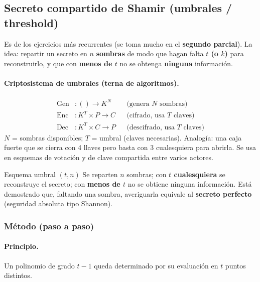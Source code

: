 \documentclass[../main.tex]{subfiles}
\begin{document}
\subsection{Secreto compartido de Shamir (umbrales / threshold)}


Es de los ejercicios más recurrentes (se toma mucho en el \textbf{segundo parcial}).
La idea: repartir un secreto en $n$ \textbf{sombras} de modo que hagan falta
\textbf{$t$ (o $k$)} para reconstruirlo, y que con \textbf{menos de $t$} no se obtenga
\textbf{ninguna} información.

\paragraph{Criptosistema de umbrales (terna de algoritmos).}
\begin{align*}
\text{Gen}&: () \to K^N &&\text{(genera } N \text{ sombras)}\\
\text{Enc}&: K^T \times P \to C &&\text{(cifrado, usa } T \text{ claves)}\\
\text{Dec}&: K^T \times C \to P &&\text{(descifrado, usa } T \text{ claves)}
\end{align*}
$N$ = sombras disponibles; $T$ = umbral (claves necesarias). Analogía: una caja
fuerte que se cierra con 4 llaves pero basta con 3 cualesquiera para abrirla.
Se usa en esquemas de votación y de clave compartida entre varios actores.

\begin{definicion}{Esquema umbral $(t,n)$}
Se reparten $n$ sombras; con \textbf{$t$ cualesquiera} se reconstruye el secreto; con
\textbf{menos de $t$} no se obtiene ninguna información. Está demostrado que, faltando
una sombra, averiguarla equivale al \textbf{secreto perfecto} (seguridad absoluta
tipo Shannon).
\end{definicion}

\subsubsection{Método (paso a paso)}

\paragraph{Principio.} Un polinomio de grado $t-1$ queda determinado por su evaluación
en $t$ puntos distintos.
\end{document}
